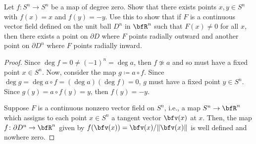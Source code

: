 \begin{problem}[Hatcher {\S}2.2, Ex.\@ 3]
Let $f\colon S^n\to S^n$ be a map of degree zero. Show that there exists
points $x,y\in S^n$ with $f(x)=x$ and $f(y)=-y$. Use this to show that if
$F$ is a continuous vector field defined on the unit ball $D^n$ in $\bfR^n$
such that $F(x)\neq 0$ for all $x$, then there exists a point on $\partial
D$ where $F$ points radially outward and another point on $\partial D^n$
where  $F$ points radially inward.
\end{problem}
\begin{proof}
Since $\deg f=0\neq (-1)^n=\deg a$, then $f\nsimeq a$ and so must have a
fixed point $x\in S^n$. Now, consider the map $g\coloneqq a\circ f$. Since
$\deg g=\deg a\circ f=(\deg a)(\deg f)=0$, $g$ must have a fixed point
$y\in S^n$. Since $g(y)=a\circ f(y)=y$, then $f(y)=-y$.

Suppose $F$ is a continuous nonzero vector field on $S^n$, i.e., a map
$S^n\to\bfR^n$ which assigns to each point $x\in S^n$ a tangent vector
$\bfv(x)$ at $x$. Then, the map $f\colon\partial D^n\to\bfR^n$ given by
$f(\bfv(x))=\bfv(x)/\|\bfv(x)\|$ is well defined and nowhere zero.
\end{proof}
\newpage

